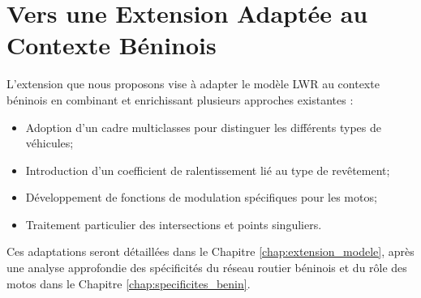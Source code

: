 \section{Vers une Extension Adaptée au Contexte Béninois}
\label{sec:vers_extension}

L'extension que nous proposons vise à adapter le modèle LWR au contexte béninois en combinant et enrichissant plusieurs approches existantes :

\begin{itemize}
\item Adoption d'un cadre multiclasses pour distinguer les différents types de véhicules;
\item Introduction d'un coefficient de ralentissement lié au type de revêtement;
\item Développement de fonctions de modulation spécifiques pour les motos;
\item Traitement particulier des intersections et points singuliers.
\end{itemize}

Ces adaptations seront détaillées dans le Chapitre \ref{chap:extension_modele}, après une analyse approfondie des spécificités du réseau routier béninois et du rôle des motos dans le Chapitre \ref{chap:specificites_benin}.
